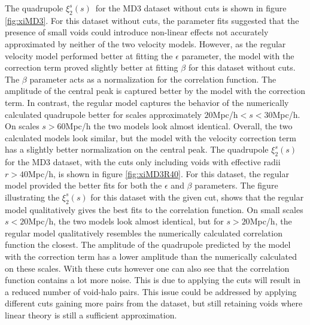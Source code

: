 The quadrupole $\xi_2^s(s)$ for the MD3 dataset without cuts is shown in figure \ref{fig:xiMD3}. For this dataset without cuts, the parameter fits suggested that the presence of small voids could introduce non-linear effects not accurately approximated by neither of the two velocity models. However, as the regular velocity model performed better at fitting the $\epsilon$ parameter, the model with the correction term proved slightly better at fitting $\beta$ for this dataset without cuts. The $\beta$ parameter acts as a normalization for the correlation function. The amplitude of the central peak is captured better by the model with the correction term. In contrast, the regular model captures the behavior of the numerically calculated quadrupole better for scales approximately $20$Mpc/h$<s<30$Mpc/h. On scales $s>60$Mpc/h the two models look almost identical. Overall, the two calculated models look similar, but the model with the velocity correction term has a slightly better normalization on the central peak. The quadrupole $\xi_2^s(s)$ for the MD3 dataset, with the cuts only including voids with effective radii $r>40$Mpc/h, is shown in figure \ref{fig:xiMD3R40}. For this dataset, the regular model provided the better fits for both the $\epsilon$ and $\beta$ parameters. The figure illustrating the $\xi_2^s(s)$ for this dataset with the given cut, shows that the regular model qualitatively gives the best fits to the correlation function. On small scales $s<20$Mpc/h, the two models look almost identical, but for $s>20$Mpc/h, the regular model qualitatively resembles the numerically calculated correlation function the closest. The amplitude of the quadrupole predicted by the model with the correction term has a lower amplitude than the numerically calculated on these scales. With these cuts however one can also see that the correlation function contains a lot more noise. This is due to applying the cuts will result in a reduced number of void-halo pairs. This issue could be addressed by applying different cuts gaining more pairs from the dataset, but still retaining voids where linear theory is still a sufficient approximation.\\\indent
